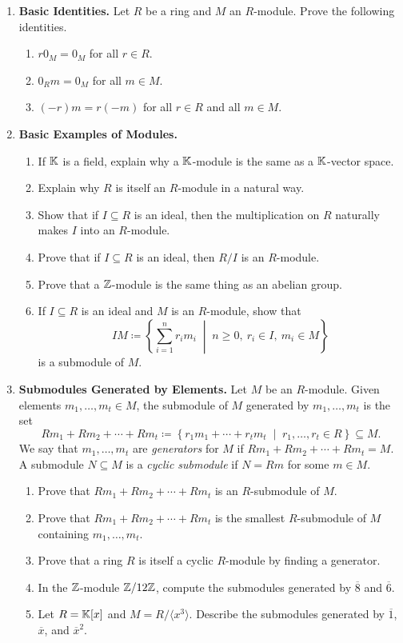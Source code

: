 \documentclass[12pt,reqno]{amsart}
\begin{document}
\begin{enumerate}[leftmargin=*, series=problems]
\item \textbf{Basic Identities.} Let $R$ be a ring and $M$ an $R$-module. Prove the following identities.
	\begin{enumerate}
	\item $r0_{M} = 0_{M}$ for all $r \in R$.
	\item $0_{R}m = 0_{M}$ for all $m \in M$. 
	\item $(-r)m=r(-m)$ for all $r \in R$ and all $m\in M$. 
	\end{enumerate}
	
\item \textbf{Basic Examples of Modules.} 
	\begin{enumerate}
	\item If $\mathbb{K}$ is a field, explain why a $\mathbb{K}$-module is the same as a $\mathbb{K}$-vector space.
	\item Explain why $R$ is itself an $R$-module in a natural way.
	\item Show that if $I \subseteq R$ is an ideal, then the multiplication on $R$ naturally makes $I$ into an $R$-module.
	\item Prove that if $I \subseteq R$ is an ideal, then $R/I$ is an $R$-module.
	\item Prove that a $\mathbb{Z}$-module is the same thing as an abelian group.
	\item If $I \subseteq R$ is an ideal and $M$ is an $R$-module, show that
\[
IM\coloneqq \left\{\sum_{i=1}^{n} r_i m_i \;\middle|\; n\geq 0,\ r_i\in I,\ m_i\in M\right\}
\]
is a submodule of $M$.
	\end{enumerate}

\item \textbf{Submodules Generated by Elements.} Let $M$ be an $R$-module. Given elements $m_{1},\ldots,m_{t} \in M$, the submodule of $M$ generated by $m_{1},\ldots,m_{t}$ is the set
\[
Rm_{1}+Rm_{2}+\cdots+Rm_{t}\coloneqq \left\{r_1m_1+\cdots+r_tm_t \;\middle|\; r_1,\ldots,r_t \in R \right\} \subseteq M. 
\]
We say that $m_{1},\ldots,m_{t}$ are \emph{generators} for $M$ if $Rm_{1}+Rm_{2}+\cdots+Rm_{t}=M$.  A submodule $N \subseteq M$ is a \emph{cyclic submodule} if $N=Rm$ for some $m\in M$. 
	\begin{enumerate}
	\item Prove that $Rm_{1}+Rm_{2}+\cdots+Rm_{t}$ is an $R$-submodule of $M$.
	\item Prove that $Rm_{1}+Rm_{2}+\cdots+Rm_{t}$ is the smallest $R$-submodule of $M$ containing $m_{1},\ldots,m_{t}$. 
	\item Prove that a ring $R$ is itself a cyclic $R$-module by finding a generator. 
	\item In the $\mathbb{Z}$-module $\mathbb{Z}/12\mathbb{Z}$, compute the submodules generated by $\overline{8}$ and $\overline{6}$.
	\item Let $R=\mathbb{K}[x]$ and $M=R/\langle x^3 \rangle$. Describe the submodules generated by $\overline{1}$, $\overline{x}$, and $\overline{x}^2$. 
	\end{enumerate}
\end{enumerate}
\end{document}
